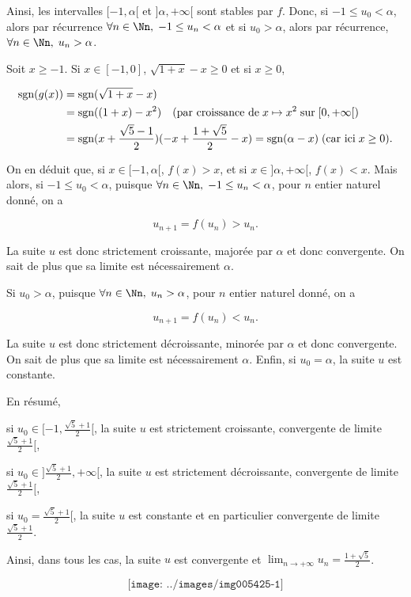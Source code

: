 {{\begin{enumerate}
Ainsi, les intervalles $[-1,\alpha[$ et $]\alpha,+\infty[$ sont stables par $f$. Donc, si $-1\leq u_0<\alpha$, alors par récurrence $\forall n\in\Nn,\;-1\leq u_n<\alpha$ et si $u_0>\alpha$, alors par récurrence, $\forall n\in\Nn,\;u_n>\alpha$.

Soit $x\geq-1$. Si $x\in[-1,0]$, $\sqrt{1+x}-x\geq0$ et si $x\geq0$,

\begin{align*}\ensuremath
\mbox{sgn}(g(x))&=\mbox{sgn}(\sqrt{1+x}-x)\\
 &=\mbox{sgn}((1+x)-x^2)\quad(\mbox{par croissance de}\;x\mapsto x^2\;\mbox{sur}\;[0,+\infty[)\\
 &=\mbox{sgn}(x+\frac{\sqrt{5}-1}{2})(-x+\frac{1+\sqrt{5}}{2}-x)=\mbox{sgn}(\alpha-x)\;(\mbox{car ici}\;x\geq0).
\end{align*}

On en déduit que, si $x\in[-1,\alpha[$, $f(x)>x$, et si $x\in]\alpha,+\infty[$, $f(x)<x$. Mais alors, 
si $-1\leq u_0<\alpha$, puisque $\forall n\in\Nn,\;-1\leq u_n<\alpha$, pour $n$ entier naturel donné, on a

$$u_{n+1}=f(u_n)>u_n.$$

La suite $u$ est donc strictement croissante, majorée par $\alpha$ et donc convergente. On sait de plus que sa limite est nécessairement $\alpha$.

Si $u_0>\alpha$, puisque $\forall n\in\Nn,\;u_n>\alpha$, pour $n$ entier naturel donné, on a

$$u_{n+1}=f(u_n)<u_n.$$

La suite $u$ est donc strictement décroissante, minorée par $\alpha$ et donc convergente. On sait de plus que sa limite est nécessairement $\alpha$. Enfin, si $u_0=\alpha$, la suite $u$ est constante.

En résumé,

si $u_0\in[-1,\frac{\sqrt{5}+1}{2}[$, la suite $u$ est strictement croissante, convergente de limite $\frac{\sqrt{5}+1}{2}[$,

si $u_0\in]\frac{\sqrt{5}+1}{2},+\infty[$, la suite $u$ est strictement décroissante, convergente de limite $\frac{\sqrt{5}+1}{2}[$,

si $u_0=\frac{\sqrt{5}+1}{2}[$, la suite $u$ est constante et en particulier convergente de limite $\frac{\sqrt{5}+1}{2}$.

Ainsi, dans tous les cas, la suite $u$ est convergente et $\lim_{n\rightarrow +\infty}u_n=\frac{1+\sqrt{5}}{2}$.

$$\texttt{[image: ../images/img005425-1]}$$



\end{enumerate}}}
